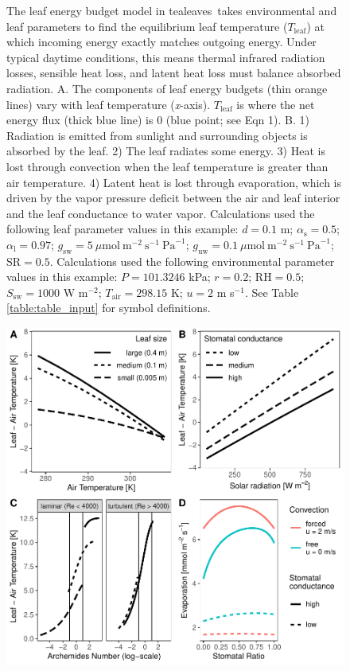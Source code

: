 \documentclass[11pt, oneside]{article}
\newcommand{\pkg}[1]{{\fontseries{b}\selectfont #1}}
\newcommand{\tealeaves}{\pkg{tealeaves}}
\begin{document}
\begin{figure}[t!]
\caption{The leaf energy budget model in \tealeaves~takes environmental and leaf parameters to find the equilibrium leaf temperature ($T_\mathrm{leaf}$) at which incoming energy exactly matches outgoing energy. Under typical daytime conditions, this means thermal infrared radiation losses, sensible heat loss, and latent heat loss must balance absorbed radiation. A. The components of leaf energy budgets (thin orange lines) vary with leaf temperature (\textit{x}-axis). $T_\mathrm{leaf}$ is where the net energy flux (thick blue line) is 0 (blue point; see Eqn 1). B. 1) Radiation is emitted from sunlight and surrounding objects is absorbed by the leaf. 2) The leaf radiates some energy. 3) Heat is lost through convection when the leaf temperature is greater than air temperature. 4) Latent heat is lost through evaporation, which is driven by the vapor pressure deficit between the air and leaf interior and the leaf conductance to water vapor. Calculations used the following leaf parameter values in this example: $d = 0.1$ m; $\alpha_\mathrm{s} = 0.5$; $\alpha_\mathrm{l} = 0.97$; $g_\mathrm{sw} = 5~\mu \textrm{mol}~\textrm{m} ^ {-2}~\textrm{s} ^ {-1}~\textrm{Pa} ^ {-1}$; $g_\mathrm{uw} = 0.1~\mu \textrm{mol}~\textrm{m} ^ {-2}~\textrm{s} ^ {-1}~\textrm{Pa} ^ {-1}$; $\mathrm{SR} = 0.5$. Calculations used the following environmental parameter values in this example: $P = 101.3246$ kPa; $r = 0.2$; $\mathrm{RH} = 0.5$; $S_\mathrm{sw} = 1000$ W m$^{-2}$; $T_\mathrm{air} = 298.15$ K; $u = 2$ m s$^{-1}$. See Table \ref{table:table_input} for symbol definitions.}
\label{fig:fig1}
\end{figure}

\clearpage

\begin{figure}[ht]
\centerline{\includegraphics[width=\textwidth,height=\textwidth]{../figures/fig2.pdf}}
\end{figure}
\end{document}
